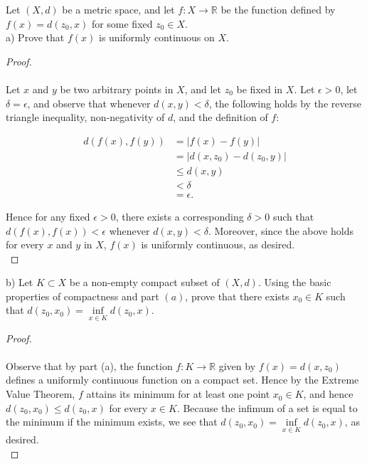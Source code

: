 Let $(X, d)$ be a metric space, and let $f: X \to \mathbb{R}$ be the function defined by \linebreak
$f(x) = d(z_0, x)$ for some fixed $z_0 \in X$. \\

a) Prove that $f(x)$ is uniformly continuous on $X$.

\begin{proof}\ \\\\
   Let $x$ and $y$ be two arbitrary points in $X$, and let $z_0$ be fixed in $X$. Let $\epsilon > 0$, let 
   $\delta = \epsilon$, and observe that whenever $d(x, y) < \delta$, the following holds by the reverse triangle
   inequality, non-negativity of $d$, and the definition of $f$:

   \begin{align*} 
      d(f(x), f(y)) &= |f(x) - f(y)| \\
                    &= |d(x, z_0) - d(z_0, y)| \\
                    &\le d(x, y) \\
                    &< \delta \\
                    &= \epsilon.
   \end{align*}

   Hence for any fixed $\epsilon > 0$, there exists a corresponding $\delta > 0$ such that $d(f(x), f(x)) < \epsilon$
   whenever $d(x, y) < \delta$. Moreover, since the above holds for every $x$ and $y$ in $X$, $f(x)$ is uniformly
   continuous, as desired.
   \ \\
\end{proof}

\pagebreak


b) Let $K \subset X$ be a non-empty compact subset of $(X, d)$. Using the basic properties of compactness and part 
   $(a)$, prove that there exists $x_0 \in K$ such that \linebreak
   $d(z_0, x_0) = \inf\limits_{x \in K}{d(z_0, x)}$.

\begin{proof}\ \\\\
   Observe that by part (a), the function $f:K \to \mathbb{R}$ given by $f(x) = d(x, z_0)$ defines a uniformly
   continuous function on a compact set. Hence by the Extreme Value Theorem, $f$ attains its minimum for at least one
   point $x_0 \in K$, and hence $d(z_0, x_0) \le d(z_0, x)$ for every $x \in K$. Because the infimum of a set is equal
   to the minimum if the minimum exists, we see that $d(z_0, x_0) = \inf\limits_{x \in K}{d(z_0, x)}$, as desired.
   \ \\
\end{proof}

\pagebreak